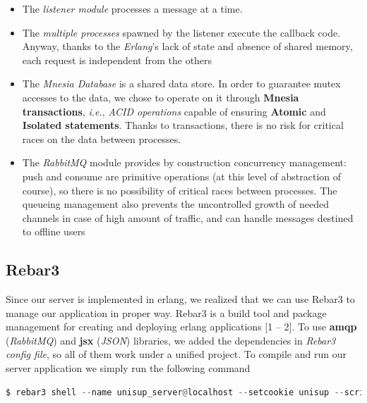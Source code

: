 \begin{itemize}
	\item The \textit{listener module} processes a message at a time.
	\item The \textit{multiple processes} spawned by the listener execute the callback code. Anyway, thanks to the \textit{Erlang}’s lack of state and absence of shared memory, each request is independent from the others
	\item The \textit{Mnesia Database} is a shared data store. In order to guarantee mutex accesses to the data, we chose to operate on it through \textbf{Mnesia transactions}, \textit{i.e.}, \textit{ACID operations} capable of ensuring \textbf{Atomic} and \textbf{Isolated statements}. Thanks to transactions, there is no risk for critical races on the data between processes.
	\item The \textit{RabbitMQ} module provides by construction concurrency management: push and consume are primitive operations (at this level of abstraction of course), so there is no possibility of critical races between processes. 
The queueing management also prevents the uncontrolled growth of needed channels in case of high amount of traffic, and can handle messages destined to offline users
\end{itemize}

\subsection{Rebar3}
Since our server is implemented in erlang, we realized that we can use Rebar3 to manage our application in proper way. Rebar3 is a build tool and package management for creating and deploying erlang applications [1 – 2]. To use \textbf{amqp} (\textit{RabbitMQ}) and \textbf{jsx} (\textit{JSON}) libraries, we added the dependencies in \textit{Rebar3 config file}, so all of them work under a unified project. To compile and run our server application we simply run the following command

\begin{lstlisting}[language=python]
	$ rebar3 shell --name unisup_server@localhost --setcookie unisup --script src/run\_listener.escript
\end{lstlisting}

